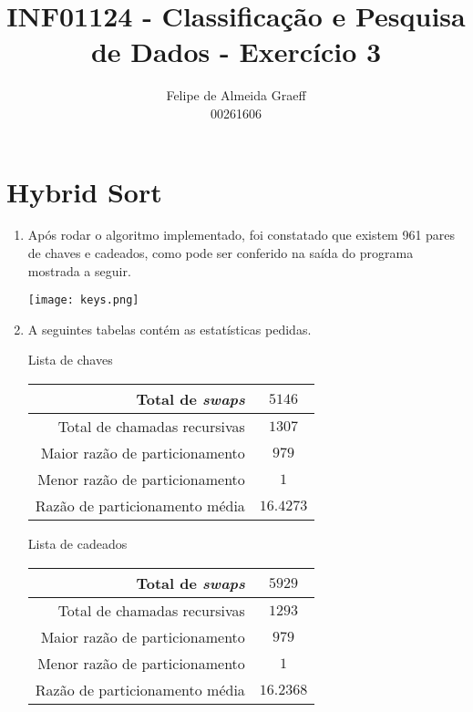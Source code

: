 \documentclass[10pt,a4paper]{article}
\begin{document}
	\title{INF01124 - Classificação e Pesquisa de Dados - Exercício 3}
	\date{}
	\author{Felipe de Almeida Graeff\\00261606}
	\maketitle

	\section{Hybrid Sort}

		\begin{enumerate}

			\item Após rodar o algoritmo implementado, foi constatado que existem
      961 pares de chaves e cadeados, como pode ser conferido na saída do
      programa mostrada a seguir.

      \texttt{[image: keys.png]}

			\item A seguintes tabelas contém as estatísticas pedidas.

        {\large Lista de chaves}

        \begin{tabular}{ r | c }
          Total de \emph{swaps}           & $5146$    \\  \hline
          Total de chamadas recursivas    & $1307$    \\  \hline
          Maior razão de particionamento  & $979$     \\  \hline
          Menor razão de particionamento  & $1$       \\  \hline
          Razão de particionamento média  & $16.4273$ \\
        \end{tabular}


        {\large Lista de cadeados}

        \begin{tabular}{ r | c }
          Total de \emph{swaps}           & $5929$    \\  \hline
          Total de chamadas recursivas    & $1293$    \\  \hline
          Maior razão de particionamento  & $979$     \\  \hline
          Menor razão de particionamento  & $1$       \\  \hline
          Razão de particionamento média  & $16.2368$ \\
        \end{tabular}


\end{enumerate}
\end{document}
